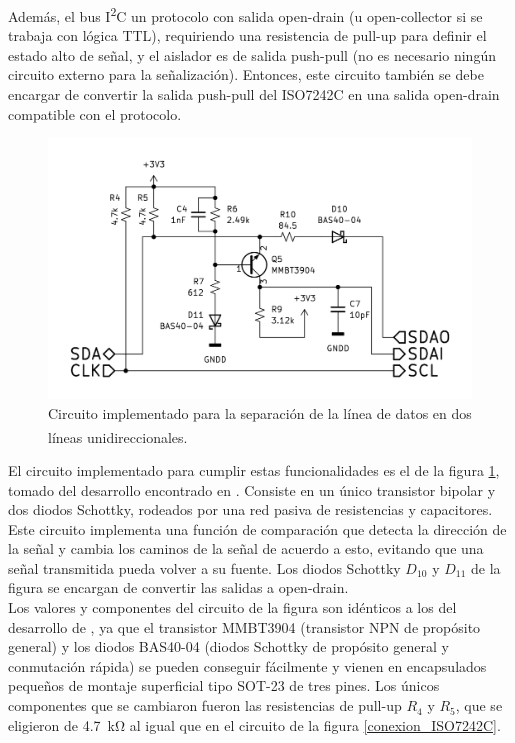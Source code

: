 Además, el bus I\textsuperscript{2}C un protocolo con salida open-drain (u open-collector si se trabaja con lógica TTL), requiriendo una resistencia de pull-up para definir el estado alto de señal, y el aislador es de salida push-pull (no es necesario ningún circuito externo para la señalización). Entonces, este circuito también se debe encargar de convertir la salida push-pull del ISO7242C en una salida open-drain compatible con el protocolo.\\

\begin{figure}[h]
    \centering
    \includegraphics[scale=1.2]{Imagenes/Circuito Separacion I2C.png}
    \caption{Circuito implementado para la separación de la línea de datos en dos líneas unidireccionales.\textsuperscript{\cite{I2C-ISO}}}
    \label{circuito_sep_i2c}
\end{figure}

El circuito implementado para cumplir estas funcionalidades es el de la figura \ref{circuito_sep_i2c}, tomado del desarrollo encontrado en \cite{I2C-ISO}. Consiste en un único transistor bipolar y dos diodos Schottky, rodeados por una red pasiva de resistencias y capacitores. Este circuito implementa una función de comparación que detecta la dirección de la señal y cambia los caminos de la señal de acuerdo a esto, evitando que una señal transmitida pueda volver a su fuente. Los diodos Schottky $D_{10}$ y $D_{11}$ de la figura se encargan de convertir las salidas a open-drain.\\

Los valores y componentes del circuito de la figura son idénticos a los del desarrollo de \cite{I2C-ISO}, ya que el transistor MMBT3904 (transistor NPN de propósito general) y los diodos BAS40-04 (diodos Schottky de propósito general y conmutación rápida) se pueden conseguir fácilmente y vienen en encapsulados pequeños de montaje superficial tipo SOT-23 de tres pines. Los únicos componentes que se cambiaron fueron las resistencias de pull-up $R_4$ y $R_5$, que se eligieron de \SI[]{4.7}[]{\kilo\ohm} al igual que en el circuito de la figura \ref{conexion_ISO7242C}.\\